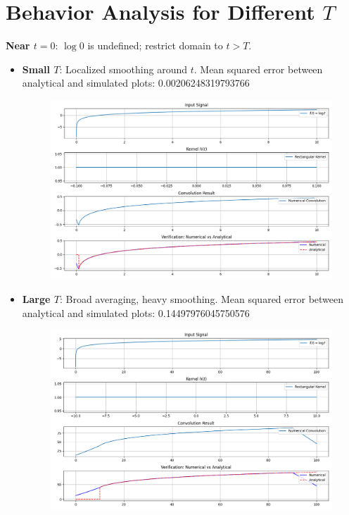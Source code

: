 \documentclass{article}
\begin{document}
\section*{Behavior Analysis for Different \( T \)}
\textbf{Near \( t=0 \)}: \( \log 0 \) is undefined; restrict domain to \( t > T \).
\begin{itemize}
    \item \textbf{Small \( T \)}: Localized smoothing around \( t \). Mean squared error between analytical and simulated plots: 0.00206248319793766
    \begin{figure}[H]
    \centering
    \includegraphics[width=1\textwidth]{2.png}
    \end{figure}
    \item \textbf{Large \( T \)}: Broad averaging, heavy smoothing. Mean squared error between analytical and simulated plots: 0.14497976045750576
    \begin{figure}[H]
    \centering
    \includegraphics[width=1\textwidth]{1.png}
    \end{figure}
   
\end{itemize}
\end{document}

